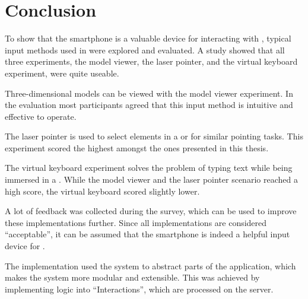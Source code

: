 \chapter{Conclusion}\label{chapter:conclusion}

To show that the smartphone is a valuable device for interacting with , typical input methods used in  were explored and evaluated. A  study showed that all three experiments, the model viewer, the laser pointer, and the virtual keyboard experiment, were quite useable.

Three-dimensional models can be viewed with the model viewer experiment. In the evaluation most participants agreed that this input method is intuitive and effective to operate.

The laser pointer is used to select elements in a  or for similar pointing tasks. This experiment scored the highest amongst the ones presented in this thesis. 

The virtual keyboard experiment solves the problem of typing text while being immersed in a . While the model viewer and the laser pointer scenario reached a high score, the virtual keyboard scored slightly lower. 

A lot of feedback was collected during the survey, which can be used to improve these implementations further. Since all implementations are considered \enquote{acceptable}, it can be assumed that the smartphone is indeed a helpful input device for .

The implementation used the  system to abstract parts of the application, which makes the system more modular and extensible. This was achieved by implementing logic into \enquote{Interactions}, which are processed on the server. 